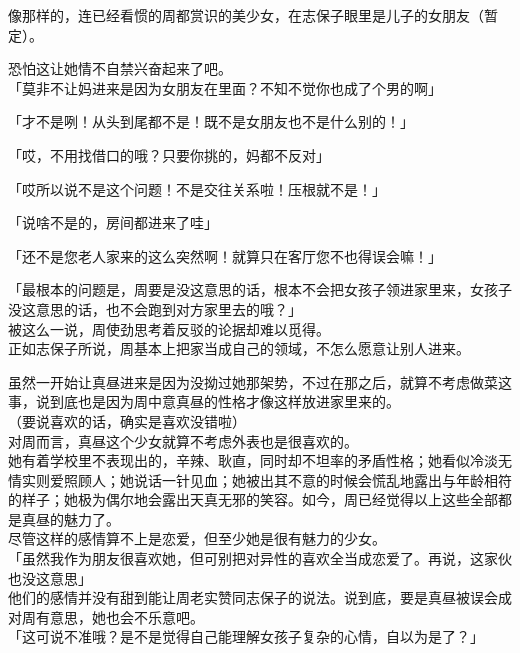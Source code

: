 像那样的，连已经看惯的周都赏识的美少女，在志保子眼里是儿子的女朋友（暂定）。

恐怕这让她情不自禁兴奋起来了吧。\\

「莫非不让妈进来是因为女朋友在里面？不知不觉你也成了个男的啊」

「才不是咧！从头到尾都不是！既不是女朋友也不是什么别的！」

「哎，不用找借口的哦？只要你挑的，妈都不反对」

「哎所以说不是这个问题！不是交往关系啦！压根就不是！」

「说啥不是的，房间都进来了哇」

「还不是您老人家来的这么突然啊！就算只在客厅您不也得误会嘛！」

「最根本的问题是，周要是没这意思的话，根本不会把女孩子领进家里来，女孩子没这意思的话，也不会跑到对方家里去的哦？」\\

被这么一说，周使劲思考着反驳的论据却难以觅得。\\

正如志保子所说，周基本上把家当成自己的领域，不怎么愿意让别人进来。

虽然一开始让真昼进来是因为没拗过她那架势，不过在那之后，就算不考虑做菜这事，说到底也是因为周中意真昼的性格才像这样放进家里来的。\\

（要说喜欢的话，确实是喜欢没错啦）\\

对周而言，真昼这个少女就算不考虑外表也是很喜欢的。\\

她有着学校里不表现出的，辛辣、耿直，同时却不坦率的矛盾性格；她看似冷淡无情实则爱照顾人；她说话一针见血；她被出其不意的时候会慌乱地露出与年龄相符的样子；她极为偶尔地会露出天真无邪的笑容。如今，周已经觉得以上这些全部都是真昼的魅力了。\\

尽管这样的感情算不上是恋爱，但至少她是很有魅力的少女。\\

「虽然我作为朋友很喜欢她，但可别把对异性的喜欢全当成恋爱了。再说，这家伙也没这意思」\\

他们的感情并没有甜到能让周老实赞同志保子的说法。说到底，要是真昼被误会成对周有意思，她也会不乐意吧。\\

「这可说不准哦？是不是觉得自己能理解女孩子复杂的心情，自以为是了？」

